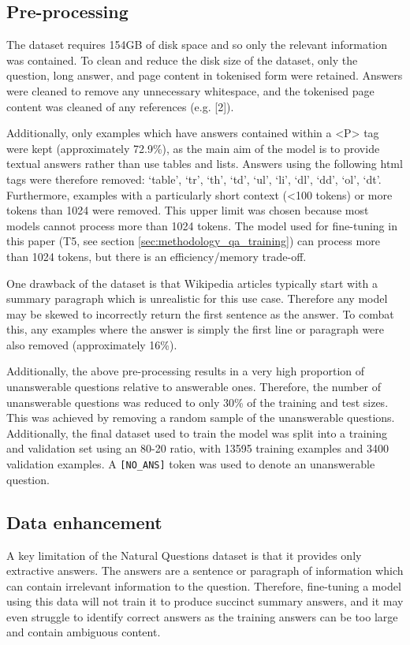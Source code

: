 \subsection{Pre-processing}
The dataset requires 154GB of disk space and so only the relevant information was contained. To clean and reduce the disk size of the dataset, only the question, long answer, and page content in tokenised form were retained. Answers were cleaned to remove any unnecessary whitespace, and the tokenised page content was cleaned of any references (e.g. [2]).

Additionally, only examples which have answers contained within a <P> tag were kept (approximately 72.9\%), as the main aim of the model is to provide textual answers rather than use tables and lists. Answers using the following \acrshort{html} tags were therefore removed: `table', `tr', `th', `td', `ul', `li', `dl', `dd', `ol', `dt'. Furthermore, examples with a particularly short context (<100 tokens) or more tokens than 1024 were removed. This upper limit was chosen because most models cannot process more than 1024 tokens. The model used for fine-tuning in this paper (T5, see section \ref{sec:methodology_qa_training}) can process more than 1024 tokens, but there is an efficiency/memory trade-off.

One drawback of the dataset is that Wikipedia articles typically start with a summary paragraph which is unrealistic for this use case. Therefore any model may be skewed to incorrectly return the first sentence as the answer. To combat this, any examples where the answer is simply the first line or paragraph were also removed (approximately 16\%).

Additionally, the above pre-processing results in a very high proportion of unanswerable questions relative to answerable ones. Therefore, the number of unanswerable questions was reduced to only 30\% of the training and test sizes. This was achieved by removing a random sample of the unanswerable questions. Additionally, the final dataset used to train the model was split into a training and validation set using an 80-20 ratio, with 13595 training examples and 3400 validation examples. A \texttt{[NO\_ANS]} token was used to denote an unanswerable question.

\subsection{Data enhancement}
A key limitation of the Natural Questions dataset is that it provides only extractive answers. The answers are a sentence or paragraph of information which can contain irrelevant information to the question. Therefore, fine-tuning a model using this data will not train it to produce succinct summary answers, and it may even struggle to identify correct answers as the training answers can be too large and contain ambiguous content.

